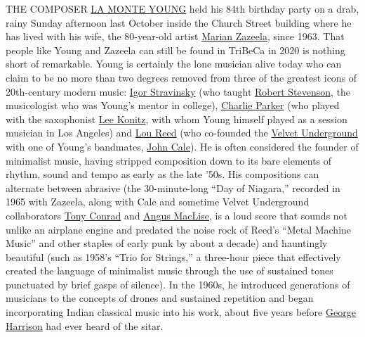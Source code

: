THE COMPOSER
\href{https://www.nytimes3xbfgragh.onion/2015/08/23/arts/music/la-monte-young-is-still-patiently-working-on-a-glacial-scale.html}{LA
MONTE YOUNG} held his 84th birthday party on a drab, rainy Sunday
afternoon last October inside the Church Street building where he has
lived with his wife, the 80-year-old artist
\href{https://www.nytimes3xbfgragh.onion/2015/04/03/arts/design/young-and-zazeelas-dream-house-is-getting-a-new-lease-at-dia.html}{Marian
Zazeela}, since 1963. That people like Young and Zazeela can still be
found in TriBeCa in 2020 is nothing short of remarkable. Young is
certainly the lone musician alive today who can claim to be no more than
two degrees removed from three of the greatest icons of 20th-century
modern music:
\href{https://www.nytimes3xbfgragh.onion/topic/person/igor-stravinsky}{Igor
Stravinsky} (who taught
\href{https://newsroom.ucla.edu/faculty-bulletin-board/in-memoriam--leading-music-scholar-robert-m--stevenson}{Robert
Stevenson}, the musicologist who was Young's mentor in college),
\href{https://www.nytimes3xbfgragh.onion/topic/person/charlie-parker}{Charlie
Parker} (who played with the saxophonist
\href{https://www.nytimes3xbfgragh.onion/2020/04/16/arts/music/lee-konitz-dead-coronavirus.html}{Lee
Konitz}, with whom Young himself played as a session musician in Los
Angeles) and
\href{https://www.nytimes3xbfgragh.onion/topic/person/lou-reed}{Lou
Reed} (who co-founded the
\href{https://www.nytimes3xbfgragh.onion/topic/organization/the-velvet-underground}{Velvet
Underground} with one of Young's bandmates,
\href{https://www.nytimes3xbfgragh.onion/2018/10/11/arts/music/velvet-underground-experience-john-cale.html}{John
Cale}). He is often considered the founder of minimalist music, having
stripped composition down to its bare elements of rhythm, sound and
tempo as early as the late '50s. His compositions can alternate between
abrasive (the 30-minute-long ``Day of Niagara,'' recorded in 1965 with
Zazeela, along with Cale and sometime Velvet Underground collaborators
\href{https://www.nytimes3xbfgragh.onion/2016/04/10/arts/artsspecial/tony-conrad-experimental-filmmaker-and-musician-dies-at-76.html}{Tony
Conrad} and
\href{https://www.nytimes3xbfgragh.onion/2011/05/06/arts/music/angus-maclise-of-velvet-underground-in-dreamweapon.html}{Angus
MacLise}, is a loud score that sounds not unlike an airplane engine and
predated the noise rock of Reed's ``Metal Machine Music'' and other
staples of early punk by about a decade) and hauntingly beautiful (such
as 1958's ``Trio for Strings,'' a three-hour piece that effectively
created the language of minimalist music through the use of sustained
tones punctuated by brief gasps of silence). In the 1960s, he introduced
generations of musicians to the concepts of drones and sustained
repetition and began incorporating Indian classical music into his work,
about five years before
\href{https://www.nytimes3xbfgragh.onion/2001/12/01/arts/george-harrison-quiet-beatle-and-lead-guitarist-dies-at-58.html}{George
Harrison} had ever heard of the sitar.

